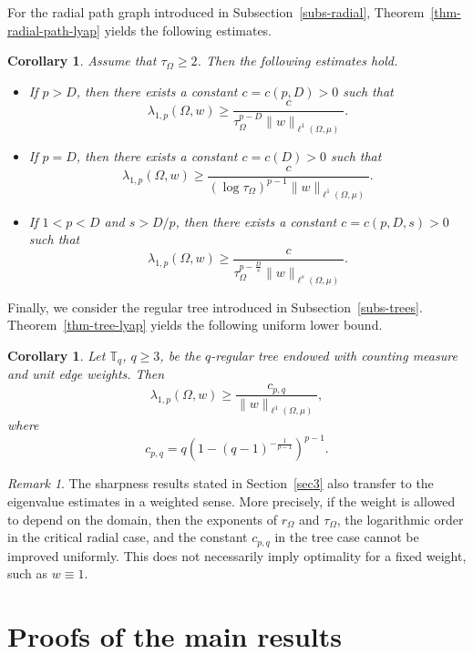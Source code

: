 \documentclass[twoside,12pt,letter]{article}
\theoremstyle{plain}
\newtheorem{corollary}[theorem]{Corollary}
\theoremstyle{definition}
\theoremstyle{remark}
\newtheorem{remark}[theorem]{Remark}
\numberwithin{equation}{section}
\begin{document}
For the radial path graph introduced in Subsection~\ref{subs-radial},
Theorem~\ref{thm-radial-path-lyap} yields the following estimates.

\begin{corollary}\label{cor-eigen-radial-path}
Assume that \(\tau_\Omega\ge 2\). Then the following estimates hold.
\begin{itemize}
\item[{\rm(i)}] If \(p>D\), then there exists a constant \(c=c(p,D)>0\) such
that
\[
\lambda_{1,p}(\Omega,w)
\ge
\frac{c}{\tau_\Omega^{p-D}\|w\|_{\ell^1(\Omega,\mu)}}.
\]

\item[{\rm(ii)}] If \(p=D\), then there exists a constant \(c=c(D)>0\) such
that
\[
\lambda_{1,p}(\Omega,w)
\ge
\frac{c}{(\log \tau_\Omega)^{p-1}\|w\|_{\ell^1(\Omega,\mu)}}.
\]

\item[{\rm(iii)}] If \(1<p<D\) and \(s>D/p\), then there exists a constant
\(c=c(p,D,s)>0\) such that
\[
\lambda_{1,p}(\Omega,w)
\ge
\frac{c}{\tau_\Omega^{p-\frac{D}{s}}\|w\|_{\ell^s(\Omega,\mu)}}.
\]
\end{itemize}
\end{corollary}

Finally, we consider the regular tree introduced in
Subsection~\ref{subs-trees}. Theorem~\ref{thm-tree-lyap} yields the following
uniform lower bound.

\begin{corollary}\label{cor-eigen-tree}
Let \(\mathbb{T}_q\), \(q\ge 3\), be the \(q\)-regular tree endowed with
counting measure and unit edge weights. Then
\[
\lambda_{1,p}(\Omega,w)
\ge
\frac{c_{p,q}}{\|w\|_{\ell^1(\Omega,\mu)}},
\]
where
\[
c_{p,q}
=
q\left(1-(q-1)^{-\frac{1}{p-1}}\right)^{p-1}.
\]
\end{corollary}

\begin{remark}
The sharpness results stated in Section~\ref{sec3} also transfer to the
eigenvalue estimates in a weighted sense. More precisely, if the weight is
allowed to depend on the domain, then the exponents of \(r_\Omega\) and
\(\tau_\Omega\), the logarithmic order in the critical radial case, and the
constant \(c_{p,q}\) in the tree case cannot be improved uniformly. This does
not necessarily imply optimality for a fixed weight, such as \(w\equiv 1\).
\end{remark}

\section{Proofs of the main results}\label{sec5}
\end{document}
